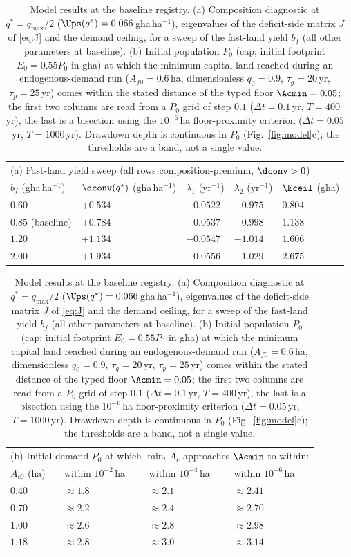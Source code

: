 \begin{table}[!htbp]
\centering\small
\caption{Model results at the baseline registry. (a) Composition diagnostic at $q^*=q_{\max}/2$ ($\Ups(q^*)=0.066$\,gha\,ha$^{-1}$), eigenvalues of the deficit-side matrix $J$ of \eqref{eq:J} and the demand ceiling, for a sweep of the fast-land yield $b_f$ (all other parameters at baseline). (b) Initial population $P_0$ (cap; initial footprint $E_0=0.55P_0$ in gha) at which the minimum capital land reached during an endogenous-demand run ($A_{f0}=0.6$\,ha, dimensionless $q_0=0.9$, $\tau_g=20$\,yr, $\tau_p=25$\,yr) comes within the stated distance of the typed floor $\Acmin=0.05$; the first two columns are read from a $P_0$ grid of step $0.1$ ($\Delta t=0.1$\,yr, $T=400$\,yr), the last is a bisection using the $10^{-6}$\,ha floor-proximity criterion ($\Delta t=0.05$\,yr, $T=1000$\,yr). Drawdown depth is continuous in $P_0$ (Fig.~\ref{fig:model}c); the thresholds are a band, not a single value.}
\label{tab:model}
\begin{tabular}{l l l l l}
\toprule
\multicolumn{5}{l}{(a) Fast-land yield sweep (all rows composition-premium, $\dconv>0$)}\\
$b_f$ (gha\,ha$^{-1}$) & $\dconv(q^*)$ (gha\,ha$^{-1}$) & $\lambda_1$ (yr$^{-1}$) & $\lambda_2$ (yr$^{-1}$) & $\Eceil$ (gha) \\
\midrule
$0.60$ & $+0.534$ & $-0.0522$ & $-0.975$ & $0.804$ \\
$0.85$ (baseline) & $+0.784$ & $-0.0537$ & $-0.998$ & $1.138$ \\
$1.20$ & $+1.134$ & $-0.0547$ & $-1.014$ & $1.606$ \\
$2.00$ & $+1.934$ & $-0.0556$ & $-1.029$ & $2.675$ \\
\bottomrule
\end{tabular}

\medskip
\begin{tabular}{l l l l}
\toprule
\multicolumn{4}{l}{(b) Initial demand $P_0$ at which $\min_tA_c$ approaches $\Acmin$ to within:}\\
$A_{c0}$ (ha) & within $10^{-2}$\,ha & within $10^{-4}$\,ha & within $10^{-6}$\,ha \\
\midrule
$0.40$ & $\approx1.8$ & $\approx2.1$ & $\approx2.41$ \\
$0.70$ & $\approx2.2$ & $\approx2.4$ & $\approx2.70$ \\
$1.00$ & $\approx2.6$ & $\approx2.8$ & $\approx2.98$ \\
$1.18$ & $\approx2.8$ & $\approx3.0$ & $\approx3.14$ \\
\bottomrule
\end{tabular}
\end{table}

